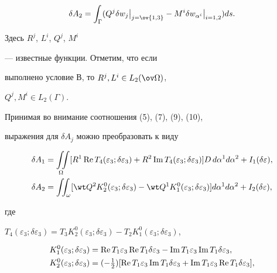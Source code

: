 $$ 


\delta A_2=\int_\Gamma(Q^j\delta w_j\big|_{j=\ov{1,3}}- 


M^i\delta w_{\alpha^i}\big|_{i=1,2})ds. 


$$ 


Здесь $R^j$, $L^i$, $Q^j$, $M^i$ 


--- известные функции. Отметим, что если 


выполнено условие В, то $R^j,L^i\in L_2(\ov\Omega)$, 


$Q^j,M^i\in L_2(\Gamma)$. 


 


Принимая во внимание соотношения (5), (7), (9), (10), 


выражения для $\delta A_j$ можно преобразовать к виду 


\begin{align} 


\delta A_1&=\iint\limits_\Omega[R^1\re T_4 


(\varepsilon_3;\delta\varepsilon_3)+R^2\im T_4 


(\varepsilon_3;\delta\varepsilon_3)] 


D\,d\alpha^1d\alpha^2+I_1(\delta\varepsilon), \\ 


\delta A_2&=\iint_\omega[\wt Q^2 K^0_2 


(\varepsilon_3;\delta\varepsilon_3)-\wt Q^1 K^0_1 


(\varepsilon_3;\delta\varepsilon_3)] 


d\alpha^1d\alpha^2+I_2(\delta\varepsilon), 


\end{align} 


где 


$T_4(\varepsilon_3;\delta\varepsilon_3)=T_3 K^0_2 


(\varepsilon_3;\delta\varepsilon_3)-T_2 K^0_1 


(\varepsilon_3;\delta\varepsilon_3)$, 


\begin{equation} 


\begin{split}


K^0_1(\varepsilon_3;\delta\varepsilon_3)&=\re T_1 


\varepsilon_3\re T_1\delta\varepsilon_3-\im T_1 


\varepsilon_3\im T_1\delta\varepsilon_3,\\


K^0_2(\varepsilon_3;\delta\varepsilon_3)&=(-\tfrac{1}{2}) 


[\re T_1\varepsilon_3\im T_1\delta\varepsilon_3+ 


\im T_1\varepsilon_3\re T_1\delta\varepsilon_3], 


\end{split}


\end{equation} 


